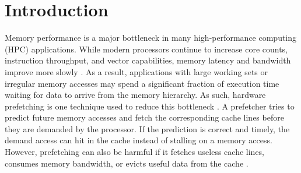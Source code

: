 \documentclass[12pt, letterpaper]{article}
\begin{document}


\newpage
\tableofcontents
\newpage
\listoftables
\listoffigures
\newpage


\begin{abstract}
Hardware prefetching is an important technique for reducing the performance impact of long memory access latencies in modern processors. Here we evaluate several hardware data prefetchers for scientific and memory-intensive benchmark kernels on a simulated out-of-order Armv8 architecture using gem5. The main focus is on the Access Map Pattern Matching (AMPM) prefetcher and the Indirect Memory Prefetcher (IMP), which are compared against the more fundamental Next-line and Stride prefetchers. The evaluation considers prefetchers placed at both the L1 data cache and the shared L2 cache, using two DDR4 memory configurations. The studied benchmarks include STREAM Triad, sparse matrix-vector multiplication, matrix multiplication, merge sort, quick sort, and breadth-first search.

The report describes the simulated architecture, benchmark selection, prefetcher configurations, and evaluation metrics. The goal is to determine which memory-access patterns favor AMPM, IMP, Next-line, and Stride, and to explain the observed speedups using prefetch accuracy, coverage, late and unused prefetches, cache placement, and memory bandwidth.
\end{abstract}


\newpage

\section{Introduction}
\label{sec:intr}

Memory performance is a major bottleneck in many high-performance computing (HPC) applications. While modern processors continue to increase core counts, instruction throughput, and vector capabilities, memory latency and bandwidth improve more slowly \cite{mittal-survey-16}. As a result, applications with large working sets or irregular memory accesses may spend a significant fraction of execution time waiting for data to arrive from the memory hierarchy. As such, hardware prefetching is one technique used to reduce this bottleneck \cite{falsafi-primer}. A prefetcher tries to predict future memory accesses and fetch the corresponding cache lines before they are demanded by the processor. If the prediction is correct and timely, the demand access can hit in the cache instead of stalling on a memory access. However, prefetching can also be harmful if it fetches useless cache lines, consumes memory bandwidth, or evicts useful data from the cache \cite{sri-hpca-07}.
\end{document}
